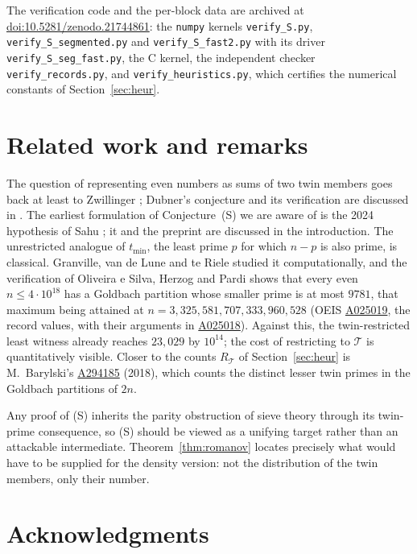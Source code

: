 \documentclass[10pt]{article}
\theoremstyle{definition}
\theoremstyle{remark}
\newcommand{\T}{\mathcal{T}}
\begin{document}
\begin{sloppypar}
The verification code and the per-block data are archived at
\href{https://doi.org/10.5281/zenodo.21744861}{doi:10.5281/zenodo.21744861}:
the \texttt{numpy} kernels \texttt{verify\_S.py},
\texttt{verify\_S\_segmented.py} and \texttt{verify\_S\_fast2.py} with its
driver \texttt{verify\_S\_seg\_fast.py}, the C kernel, the independent
checker \texttt{verify\_records.py}, and \texttt{verify\_heuristics.py},
which certifies the numerical constants of Section~\ref{sec:heur}.
\end{sloppypar}

\section{Related work and remarks}

The question of representing even numbers as sums of two twin members goes
back at least to Zwillinger \cite{Zw}; Dubner's conjecture and its
verification are discussed in \cite{Dubner, OEIS, Kourbatov}. The earliest
formulation of Conjecture~(S) we are aware of is the 2024 hypothesis of
Sahu \cite{Sahu}; it and the preprint \cite{NA} are discussed in the
introduction.
The unrestricted analogue of $t_{\min}$, the least prime $p$ for which
$n - p$ is also prime, is classical. Granville, van de Lune and te Riele
\cite{GLR} studied it computationally, and the verification of Oliveira e
Silva, Herzog and Pardi \cite{OeS} shows that every even
$n \le 4 \cdot 10^{18}$ has a Goldbach partition whose smaller prime is at
most $9781$, that maximum being attained at
$n = 3{,}325{,}581{,}707{,}333{,}960{,}528$
(OEIS \href{https://oeis.org/A025019}{A025019}, the record values, with their
arguments in \href{https://oeis.org/A025018}{A025018}). Against this, the
twin-restricted least witness already reaches $23{,}029$ by $10^{14}$; the
cost of restricting to $\T$ is quantitatively visible. Closer to
the counts $R_\T$ of Section~\ref{sec:heur} is M.~Barylski's
\href{https://oeis.org/A294185}{A294185} (2018), which counts the distinct
lesser twin primes in the Goldbach partitions of $2n$.

Any proof of (S) inherits the parity obstruction of sieve theory through its
twin-prime consequence, so (S) should be viewed as a unifying target rather
than an attackable intermediate. Theorem~\ref{thm:romanov} locates precisely
what would have to be supplied for the density version: not the distribution
of the twin members, only their number.

\section*{Acknowledgments}
\end{document}
